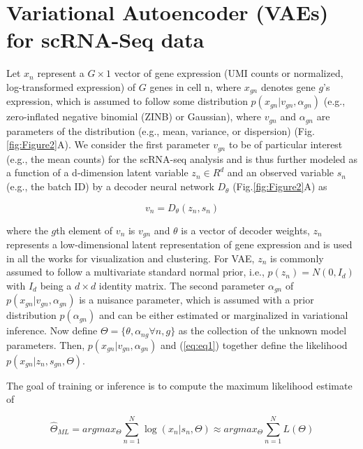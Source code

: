 \documentclass[
]{book}
\begin{document}
\hypertarget{ch-3-1}{%
\section{Variational Autoencoder (VAEs) for scRNA-Seq data}\label{ch-3-1}}

Let \(x_{n}\) represent a \(G \times 1\) vector of gene expression (UMI counts or normalized, log-transformed expression) of \(G\) genes in cell n, where \(x_{gn}\) denotes gene \(g\)'s expression, which is assumed to follow some distribution \(p(x_{gn} \vert v_{gn}, \alpha_{gn} )\) (e.g., zero-inflated negative binomial (ZINB) or Gaussian), where \(v_{gn}\) and \(\alpha_{gn}\) are parameters of the distribution (e.g., mean, variance, or dispersion) (Fig.\ref{fig:Figure2}A). We consider the first parameter \(v_{gn}\) to be of particular interest (e.g., the mean counts) for the scRNA-seq analysis and is thus further modeled as a function of a d-dimension latent variable \(z_{n} \in R^{d}\) and an observed variable \(s_{n}\) (e.g., the batch ID) by a decoder neural network \(D_{\theta}\) (Fig.\ref{fig:Figure2}A) as

\begin{equation}
v_{n} = D_{\theta}(z_{n}, s_{n}) \label{eq:eq1}
\end{equation}

where the \(g\)th element of \(v_{n}\) is \(v_{gn}\) and \(\theta\) is a vector of decoder weights, \(z_{n}\) represents a low-dimensional latent representation of gene expression and is used in all the works for visualization and clustering. For VAE, \(z_{n}\) is commonly assumed to follow a multivariate standard normal prior, i.e., \(p(z_{n})=N(0,I_{d})\) with \(I_{d}\) being a \(d \times d\) identity matrix. The second parameter \(\alpha_{gn}\) of \(p(x_{gn} \vert v_{gn}, \alpha_{gn})\) is a nuisance parameter, which is assumed with a prior distribution \(p(\alpha_{gn})\) and can be either estimated or marginalized in variational inference. Now define \(\Theta=\{\theta, \alpha_{ng}\forall{n},g\}\) as the collection of the unknown model parameters. Then, \(p(x_{gn} \vert v_{gn}, \alpha_{gn})\) and (\eqref{eq:eq1}) together define the likelihood \(p(x_{gn} \vert z_{n}, s_{gn}, \Theta)\).

The goal of training or inference is to compute the maximum likelihood estimate of \Theta 

\begin{equation}
    \hat{\Theta}_{ML} = argmax_{\Theta}\sum_{n=1}^{N}\log(x_{n} \vert s_{n},\Theta) \approx argmax_{\Theta}\sum_{n=1}^{N}\textit{L}(\Theta) \label{eq:eq2}
\end{equation}
\end{document}
